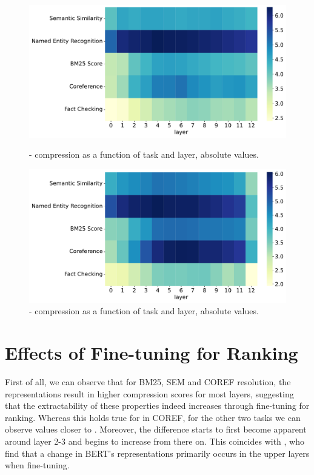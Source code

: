 \begin{figure}[!ht]
    \centering
    \includegraphics[width=\textwidth]{gfx/probing/abs_heatmap_compression_base}
    \caption{ - compression as a function of task and layer, absolute values.}
    \label{fig:abs_heatmap_comp_base}

    \centering
    \includegraphics[width=\textwidth]{gfx/probing/abs_heatmap_compression_passage}
    \caption{ - compression as a function of task and layer, absolute values.}
    \label{fig:abs_heatmap_comp_passage}
\end{figure}

\section{Effects of Fine-tuning for Ranking}
First of all, we can observe that for BM25, SEM and COREF resolution, the  representations result in higher compression scores for most layers, suggesting that the extractability of these properties indeed increases through fine-tuning for ranking. Whereas this holds true for  in COREF, for the other two tasks we can observe values closer to . Moreover, the difference starts to first become apparent around layer 2-3 and begins to increase from there on. This coincides with \cite{merchant-etal-2020-happens}, who find that a change in BERT's representations primarily occurs in the upper layers when fine-tuning.

